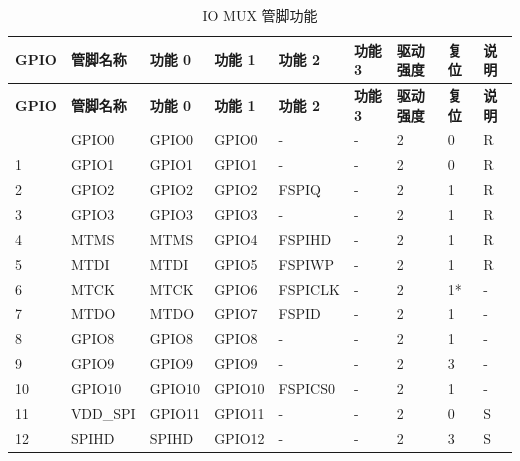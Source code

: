 
   \begin{longtable}[c]{|p{0.7cm}|p{1.9cm}|p{1.5cm}|p{1.5cm}|p{1.5cm}|p{1.5cm}|p{1.5cm}|p{1.0cm}|p{1.0cm}| }
   \caption{IO MUX 管脚功能}
    \label{tab:iomuxgpio-pin-functions} \\
        \hline
        \rowcolor{lightgray}
\textbf{GPIO} & \textbf{管脚名称} & \textbf{功能 0} & \textbf{功能 1} & \textbf{功能 2} & \textbf{功能 3} & \textbf{驱动强度} & \textbf{复位} & \textbf{说明} \\
 \hline
\endfirsthead
        \hline
        \rowcolor{lightgray}
        \textbf{GPIO} & \textbf{管脚名称} & \textbf{功能 0} & \textbf{功能 1} & \textbf{功能 2} & \textbf{功能 3} & \textbf{驱动强度} & \textbf{复位} & \textbf{说明} \\
        \hline
        \endhead
        \endfoot
0 & GPIO0     & GPIO0         & GPIO0   & -          & -            & 2           & 0 & R \\ \hline
1 & GPIO1     & GPIO1         & GPIO1   & -          & -            & 2           & 0 & R \\ \hline
2 & GPIO2            & GPIO2         & GPIO2   & FSPIQ      & -            & 2           & 1 & R \\ \hline
3 & GPIO3            & GPIO3         & GPIO3   & -          & -            & 2           & 1 & R \\ \hline
4 & MTMS             & MTMS          & GPIO4   & FSPIHD     & -            & 2           & 1 & R \\ \hline
5 & MTDI             & MTDI          & GPIO5   & FSPIWP     & -            & 2           & 1 & R \\ \hline
6 & MTCK             & MTCK          & GPIO6   & FSPICLK    & -            & 2           & 1* & - \\ \hline
7 & MTDO             & MTDO          & GPIO7   & FSPID      & -            & 2           & 1 & - \\ \hline
8 & GPIO8            & GPIO8         & GPIO8   & -          & -            & 2           & 1 & - \\ \hline
9 & GPIO9            & GPIO9         & GPIO9   & -          & -            & 2           & 3 & - \\ \hline
10 & GPIO10          &  GPIO10       & GPIO10  & FSPICS0    & -            & 2           & 1 & - \\ \hline
11 & VDD\_SPI        &  GPIO11       & GPIO11  & -          & -            & 2           & 0 & S \\ \hline
12 & SPIHD           &  SPIHD        & GPIO12  & -          & -            & 2           & 3 & S \\ \hline

\end{longtable}
